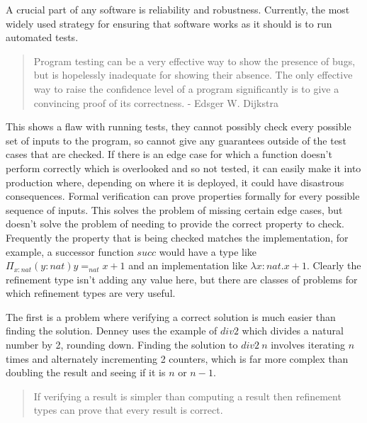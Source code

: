 A crucial part of any software is reliability and robustness.
Currently, the most widely used strategy for ensuring that software works as it should
is to run automated tests.
\begin{quote}
    Program testing can be a very effective way to show the presence of bugs, but is
    hopelessly inadequate for showing their absence.
    The only effective way to raise the confidence level of a program significantly is
    to give a convincing proof of its correctness. - Edsger W. Dijkstra \cite{dijkstra72}
\end{quote}
This shows a flaw with running tests, they cannot possibly check every possible set of inputs
to the program, so cannot give any guarantees outside of the test cases that are checked.
If there is an edge case for which a function doesn't perform correctly which is overlooked
and so not tested, it can easily make it into production where, depending on where it is
deployed, it could have disastrous consequences.
Formal verification can prove properties formally for every possible sequence of inputs.
This solves the problem of missing certain edge cases, but doesn't solve the problem of
needing to provide the correct property to check.
Frequently the property that is being checked matches the implementation, for example,
a successor function $succ$ would have a type like $\Pi_{x:nat} (y:nat) y =_{nat} x+1$
and an implementation like $\lambda x:nat . x+1$.
Clearly the refinement type isn't adding any value here,
but there are classes of problems for which refinement types are very useful.

The first is a problem where verifying a correct solution is much easier than finding
the solution.
Denney uses the example of $div2$ which divides a natural number by 2, rounding down.
Finding the solution to $div2\ n$ involves iterating $n$ times and alternately incrementing
2 counters, which is far more complex than doubling the result and seeing if it is $n$ or
$n-1$.
\begin{quote}
    If verifying a result is simpler than computing a result then refinement types can prove that
    every result is correct.
\end{quote}

